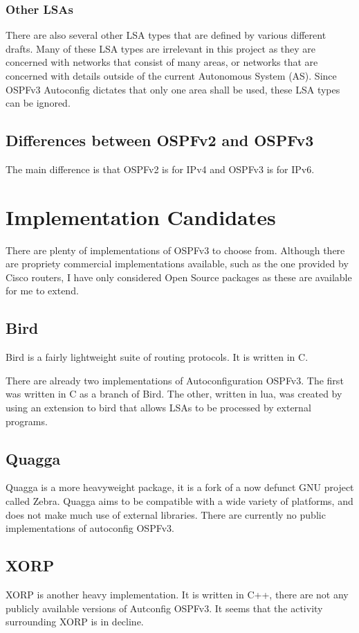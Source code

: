 \documentclass[12pt]{report}
\begin{document}
\subsubsection{Other LSAs}
There are also several other LSA types that are defined by various different
drafts.  Many of these LSA types are irrelevant in this project as they are
concerned with networks that consist of many areas, or networks that are
concerned with details outside of the current Autonomous System (AS). Since
OSPFv3 Autoconfig dictates that only one area shall be used, these LSA types
can be ignored.   

\subsection{Differences between OSPFv2 and OSPFv3}
The main difference is that OSPFv2 is for IPv4 and OSPFv3 is for IPv6. 

\section{Implementation Candidates}
There are plenty of implementations of OSPFv3 to choose from. Although there
are propriety commercial implementations available, such as the one provided by
Cisco routers, I have only considered Open Source packages as these are
available for me to extend.

\subsection{Bird}
Bird is a fairly lightweight suite of routing protocols. It is written in C. 

There are already two implementations of Autoconfiguration OSPFv3. The first
was written in C as a branch of Bird. The other, written in lua, was created by
using an extension to bird that allows LSAs to be processed by external
programs.

\subsection{Quagga}
Quagga is a more heavyweight package, it is a fork of a now defunct GNU project
called Zebra. Quagga aims to be compatible with a wide variety of platforms,
and does not make much use of external libraries. There are currently no public
implementations of autoconfig OSPFv3.

\subsection{XORP}
XORP is another heavy implementation. It is written in C++, there are not any
publicly available versions of Autconfig OSPFv3. It seems that the activity
surrounding XORP is in decline. 
\end{document}
